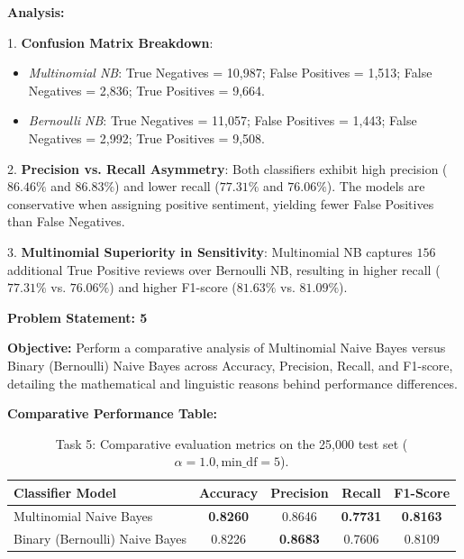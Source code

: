 \documentclass[12pt]{article}
\begin{document}
\textbf{Analysis:}

1. \textbf{Confusion Matrix Breakdown}:
\begin{itemize}
    \item \textit{Multinomial NB}: True Negatives = 10,987; False Positives = 1,513; False Negatives = 2,836; True Positives = 9,664.
    \item \textit{Bernoulli NB}: True Negatives = 11,057; False Positives = 1,443; False Negatives = 2,992; True Positives = 9,508.
\end{itemize}

2. \textbf{Precision vs. Recall Asymmetry}: Both classifiers exhibit high precision ($86.46\%$ and $86.83\%$) and lower recall ($77.31\%$ and $76.06\%$). The models are conservative when assigning positive sentiment, yielding fewer False Positives than False Negatives.

3. \textbf{Multinomial Superiority in Sensitivity}: Multinomial NB captures $156$ additional True Positive reviews over Bernoulli NB, resulting in higher recall ($77.31\%$ vs. $76.06\%$) and higher F1-score ($81.63\%$ vs. $81.09\%$).

\vspace{0.4cm}


\textbf{Problem Statement: 5}

\textbf{Objective:} Perform a comparative analysis of Multinomial Naive Bayes versus Binary (Bernoulli) Naive Bayes across Accuracy, Precision, Recall, and F1-score, detailing the mathematical and linguistic reasons behind performance differences.

\vspace{0.2cm}
\textbf{Comparative Performance Table:}

\begin{table}[H]
\centering
\begin{tabular}{@{}lcccc@{}}
\toprule
\textbf{Classifier Model} & \textbf{Accuracy} & \textbf{Precision} & \textbf{Recall} & \textbf{F1-Score} \\ \midrule
Multinomial Naive Bayes & \textbf{0.8260} & 0.8646 & \textbf{0.7731} & \textbf{0.8163} \\
Binary (Bernoulli) Naive Bayes & 0.8226 & \textbf{0.8683} & 0.7606 & 0.8109 \\ \bottomrule
\end{tabular}
\caption{Task 5: Comparative evaluation metrics on the 25,000 test set ($\alpha=1.0, \text{min\_df}=5$).}
\end{table}
\end{document}
